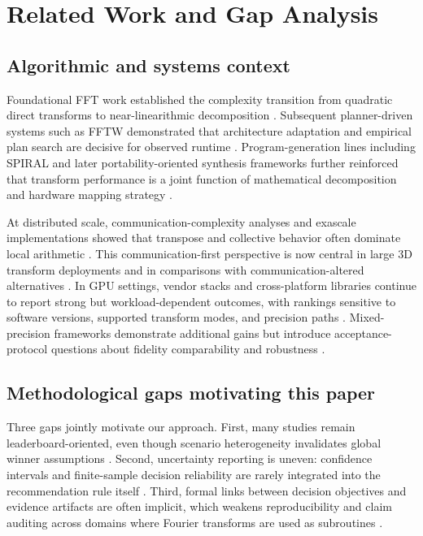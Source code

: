 \documentclass{article} %
\begin{document}
\section{Related Work and Gap Analysis}
\subsection{Algorithmic and systems context}
Foundational FFT work established the complexity transition from quadratic direct transforms to near-linearithmic decomposition \citep{S01,S22,S23}. Subsequent planner-driven systems such as FFTW demonstrated that architecture adaptation and empirical plan search are decisive for observed runtime \citep{S02,S03}. Program-generation lines including SPIRAL and later portability-oriented synthesis frameworks further reinforced that transform performance is a joint function of mathematical decomposition and hardware mapping strategy \citep{S04,S05,S11,S35}.

At distributed scale, communication-complexity analyses and exascale implementations showed that transpose and collective behavior often dominate local arithmetic \citep{S06,S07,S08,S09,S42}. This communication-first perspective is now central in large 3D transform deployments and in comparisons with communication-altered alternatives \citep{S36,S37}. In GPU settings, vendor stacks and cross-platform libraries continue to report strong but workload-dependent outcomes, with rankings sensitive to software versions, supported transform modes, and precision paths \citep{S10,S25,S26,S27,S28,S31,S39,S40}. Mixed-precision frameworks demonstrate additional gains but introduce acceptance-protocol questions about fidelity comparability and robustness \citep{S39,S41}.

\subsection{Methodological gaps motivating this paper}
Three gaps jointly motivate our approach. First, many studies remain leaderboard-oriented, even though scenario heterogeneity invalidates global winner assumptions \citep{S21,S42}. Second, uncertainty reporting is uneven: confidence intervals and finite-sample decision reliability are rarely integrated into the recommendation rule itself \citep{S03,S21}. Third, formal links between decision objectives and evidence artifacts are often implicit, which weakens reproducibility and claim auditing across domains where Fourier transforms are used as subroutines \citep{S15,S16,S18,S20}.
\end{document}
